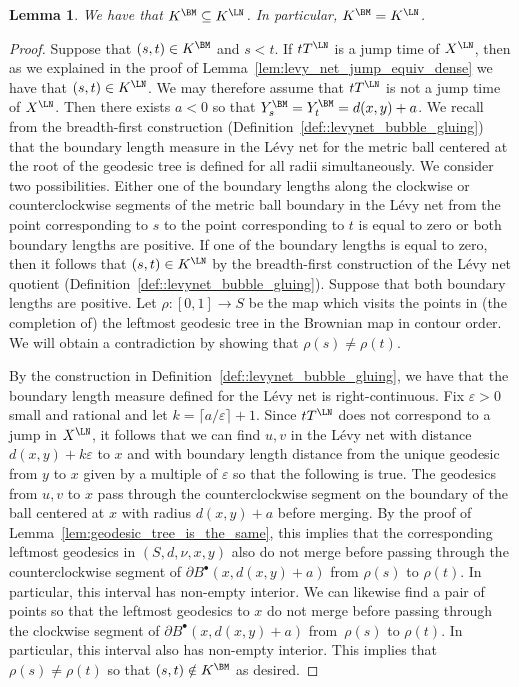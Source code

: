 \documentclass[JEP,XML,SOM,Unicode]{cedram}
\newcommand{\sbullet}{{\scriptscriptstyle\bullet}}
\let\epsilon\varepsilon
\theoremstyle{plain}
\numberwithin{theorem}{section}
\newtheorem{lemma}[theorem]{Lemma}
\theoremstyle{definition}
\newcommand{\fb}[2]{B^\sbullet(#1,#2)}
\begin{document}
\begin{lemma}
\label{lem:net_equiv_implies_levy_equiv}
We have that $K^\BM \subseteq K^\LN$. In particular, $K^\BM = K^\LN$.
\end{lemma}
\begin{proof}
Suppose that $(s,t) \in K^\BM$ and $s < t$. If $t T^\LN$ is a jump time of $X^\LN$, then as we explained in the proof of Lemma~\ref{lem:levy_net_jump_equiv_dense} we have that $(s,t) \in K^\LN$. We may therefore assume that $t T^\LN$ is not a jump time of $X^\LN$. Then there exists $a < 0$ so that $Y_s^\BM = Y_t^\BM = d(x,y)+a$. We recall from the breadth-first construction (Definition~\ref{def::levynet_bubble_gluing}) that the boundary length measure in the Lévy net for the metric ball centered at the root of the geodesic tree is defined for all radii simultaneously. We consider two possibilities. Either one of the boundary lengths along the clockwise or counterclockwise segments of the metric ball boundary in the Lévy net from the point corresponding to $s$ to the point corresponding to $t$ is equal to zero or both boundary lengths are positive. If one of the boundary lengths is equal to zero, then it follows that $(s,t) \in K^\LN$ by the breadth-first construction of the Lévy net quotient (Definition~\ref{def::levynet_bubble_gluing}). Suppose that both boundary lengths are positive. Let $\rho \colon [0,1] \to S$ be the map which visits the points in (the completion of) the leftmost geodesic tree in the Brownian map in contour order. We will obtain a contradiction by showing that $\rho(s) \neq \rho (t)$.

By the construction in Definition~\ref{def::levynet_bubble_gluing}, we have that the boundary length measure defined for the Lévy net is right-continuous. Fix $\epsilon > 0$ small and rational and let $k = \lceil a/\epsilon\rceil + 1$. Since $t T^\LN$ does not correspond to a jump in $X^\LN$, it follows that we can find $u,v$ in the Lévy net with distance $d(x,y)+ k \epsilon$ to $x$ and with boundary length distance from the unique geodesic from $y$ to $x$ given by a multiple of $\epsilon$ so that the following is true. The geodesics from $u,v$ to $x$ pass through the counterclockwise segment on the boundary of the ball centered at $x$ with radius $d(x,y)+a$ before merging. By the proof of Lemma~\ref{lem:geodesic_tree_is_the_same}, this implies that the corresponding leftmost geodesics in $(S,d,\nu,x,y)$ also do not merge before passing through the counterclockwise segment of $\partial \fb{x}{d(x,y)+a}$ from $\rho(s)$ to $\rho(t)$. In particular, this interval has non-empty interior. We can likewise find a pair of points so that the leftmost geodesics to $x$ do not merge before passing through the clockwise segment of $\partial \fb{x}{d(x,y)+a}$ from~$\rho(s)$ to $\rho(t)$. In particular, this interval also has non-empty interior. This implies that $\rho(s) \neq \rho(t)$ so that $(s,t) \notin K^\BM$ as desired.
\end{proof}
\end{document}
